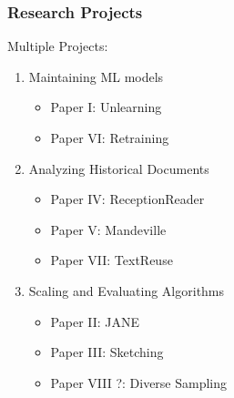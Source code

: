 \documentclass[pdf]{beamer}
\begin{document}
\begin{frame}
    \frametitle{Research Projects}

    Multiple Projects:
    \begin{enumerate}
        \item Maintaining ML models
        \begin{itemize}
            \item Paper I: Unlearning 
            \item Paper VI: Retraining
        \end{itemize}
        \item Analyzing Historical Documents 
        \begin{itemize}
            \item Paper IV: ReceptionReader
            \item Paper V: Mandeville
            \item Paper VII: TextReuse
        \end{itemize}
        \item Scaling and Evaluating Algorithms
        \begin{itemize}
            \item Paper II: JANE
            \item Paper III: Sketching 
            \item Paper VIII    ?: Diverse Sampling 
        \end{itemize}
    \end{enumerate}

\end{frame}
\end{document}
